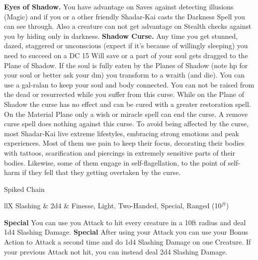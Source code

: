 \documentclass[a4paper,10pt,twoside,twocolumn]{dndbook} %
\begin{document}
	\textbf{Eyes of Shadow.} You have advantage on Saves against detecting illusions (Magic) and if you or a other friendly Shadar-Kai casts the Darkness Spell you can see through. Also a creature can not get advantage on Stealth checks against you by hiding only in darkness.
	\textbf{Shadow Curse.} Any time you get stunned, dazed, staggered or unconscious (expect if it's because of willingly sleeping) you need to succeed on a DC 15 Will save or a part of your soul gets dragged to the Plane of Shadow. If the soul is fully eaten by the Planes of Shadow (note hp for your soul or better ask your dm) you transform to a wraith (and die). You can use a gal-ralan to keep your soul and body connected. You can not be raised from the dead or resurrected while you suffer from this curse. While on the Plane of Shadow the curse has no effect and can be cured with a greater restoration spell. On the Material Plane only a wish or miracle spell can end the curse. A remove curse spell does nothing against this curse.\linebreak
	To avoid being affected by the curse, most Shadar-Kai live extreme lifestyles, embracing strong emotions and peak experiences. Most of them use pain to keep their focus, decorating their bodies with tattoos, scarification and piercings in extremely sensitive parts of their bodies. Likewise, some of them engage in self-flagellation, to the point of self-harm if they fell that they getting overtaken by the curse.
	
	
	\begin{DndSidebar}{Spiked Chain}
		\begin{DndTable}{llX}
			Slashing & 2d4 & Finesse, Light, Two-Handed, Special, Ranged (10$^{ft}$)
		\end{DndTable}
		\textbf{Special} You can use you Attack to hit every creature in a 10ft radius and deal 1d4 Slashing Damage.\linebreak
		\textbf{Special} After using your Attack you can use your Bonus Action to Attack a second time and do 1d4 Slashing Damage on one Creature. If your previous Attack not hit, you can instead deal 2d4 Slashing Damage.
	\end{DndSidebar}
	
	
\end{document}

